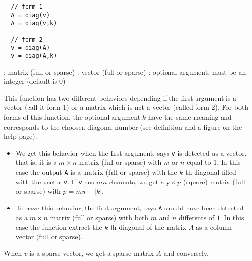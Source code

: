 \begin{mandesc}
\end{mandesc}
\begin{calling_sequence}
\begin{verbatim}
  // form 1
  A = diag(v)
  A = diag(v,k)

  // form 2
  v = diag(A)
  v = diag(A,k)
\end{verbatim}
\end{calling_sequence}
\begin{parameters}
  \begin{varlist}
    : matrix (full or sparse)
    : vector (full or sparse)
    : optional argument, must be an integer (default is $0$)
  \end{varlist}
\end{parameters}

\begin{mandescription}

  This function has two different behaviors depending if the first argument is a vector
  (call it form 1) or a matrix which is not a vector (called form 2).
  For both forms of this function, the optional argument $k$ have the same meaning and
 corresponds to the choosen diagonal number (see definition and a figure on the 
  help page).

\begin{itemize}
\item {}
   We get this behavior when the first argument, says \verb+v+ is detected as a vector, that is,
 it is a $m \times n$ matrix (full or sparse) with $m$ or $n$ equal to $1$. In this case the
 output  \verb+A+ is a matrix (full or sparse) with the $k$ th diagonal filled with the vector
 \verb+v+. If  \verb+v+ has $mn$ elements, we get a $p \times p$ (square) matrix (full or sparse)
 with $p=mn + | k |$.
   
\item {}
  To have this behavior, the first argument, says \verb+A+ should have been detected as 
a  $m \times n$ matrix (full or sparse) with both $m$ and $n$ differents of $1$. In this 
case the function extract the $k$ th diagonal of the matrix $A$ as a column vector (full or sparse).
\end{itemize}

 When $v$ is a sparse vector, we get a sparse matrix $A$ and conversely.


\end{mandescription}

